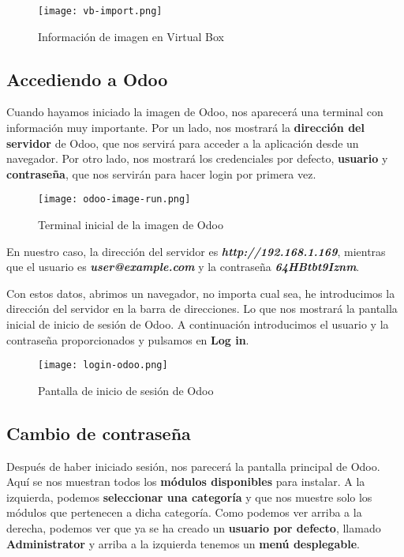 \begin{figure}[h]
    \centering
    \texttt{[image: vb-import.png]}
    \caption{Información de imagen en Virtual Box}
\end{figure}


\subsection{Accediendo a Odoo}
Cuando hayamos iniciado la imagen de Odoo, nos aparecerá una terminal con información muy importante. Por un lado, nos mostrará la \textbf{dirección del servidor} de Odoo, que nos servirá para acceder a la aplicación desde un navegador. Por otro lado, nos mostrará los credenciales por defecto, \textbf{usuario} y \textbf{contraseña}, que nos servirán para hacer login por primera vez.

\begin{figure}[h]
    \centering
    \texttt{[image: odoo-image-run.png]}
    \caption{Terminal inicial de la imagen de Odoo}
\end{figure}

En nuestro caso, la dirección del servidor es \textbf{\textit{http://192.168.1.169}}, mientras que el usuario es \textbf{\textit{user@example.com}} y la contraseña \textbf{\textit{64HBtbt9Iznm}}.

Con estos datos, abrimos un navegador, no importa cual sea, he introducimos la dirección del servidor en la barra de direcciones. Lo que nos mostrará la pantalla inicial de inicio de sesión de Odoo. A continuación introducimos el usuario y la contraseña proporcionados y pulsamos en \textbf{Log in}.


\begin{figure}[h]
    \centering
    \texttt{[image: login-odoo.png]}
    \caption{Pantalla de inicio de sesión de Odoo}
\end{figure}

\subsection{Cambio de contraseña}
Después de haber iniciado sesión, nos parecerá la pantalla principal de Odoo. Aquí se nos muestran todos los\textbf{ módulos disponibles} para instalar. A la izquierda, podemos \textbf{seleccionar una categoría} y que nos muestre solo los módulos que pertenecen a dicha categoría. Como podemos ver arriba a la derecha, podemos ver que ya se ha creado un \textbf{usuario por defecto}, llamado \textbf{Administrator} y arriba a la izquierda tenemos un \textbf{menú desplegable}.

